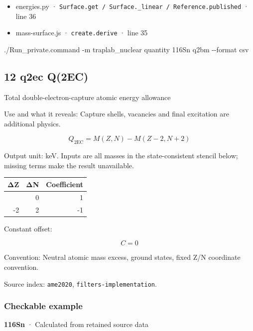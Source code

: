 \documentclass[
  11pt,
  letterpaper,
]{article}
\newenvironment{Shaded}{}{}
\newcommand{\AttributeTok}[1]{\textcolor[rgb]{0.49,0.56,0.16}{#1}}
\newcommand{\ExtensionTok}[1]{#1}
\newcommand{\NormalTok}[1]{#1}
\providecommand{\tightlist}{%
  \setlength{\itemsep}{0pt}\setlength{\parskip}{0pt}}
\begin{document}
\begin{itemize}
\tightlist
\item
  energies.py ·
  \texttt{Surface.get\ /\ Surface.\_linear\ /\ Reference.published} ·
  line 36
\item
  mass-surface.js · \texttt{create.derive} · line 35
\end{itemize}

\begin{Shaded}
\begin{Highlighting}[]
\ExtensionTok{./Run\_private.command} \AttributeTok{{-}m}\NormalTok{ traplab\_nuclear quantity 116Sn q2bm }\AttributeTok{{-}{-}format}\NormalTok{ csv}
\end{Highlighting}
\end{Shaded}

\subsection{12 q2ec Q(2EC)}\label{q2ec-q2ec}

Total double-electron-capture atomic energy allowance

Use and what it reveals: Capture shells, vacancies and final excitation
are additional physics.

\[
Q_{2{\mathrm{EC}}}=M(Z,N)-M(Z-2,N+2)
\]

Output unit: keV. Inputs are all masses in the state-consistent stencil
below; missing terms make the result unavailable.

\begin{longtable}[]{@{}rrr@{}}
\toprule\noalign{}
ΔZ & ΔN & Coefficient \\
\midrule\noalign{}
\endhead
\bottomrule\noalign{}
\endlastfoot
0 & 0 & 1 \\
-2 & 2 & -1 \\
\end{longtable}

Constant offset:

\[
C=0
\]

Convention: Neutral atomic mass excess, ground states, fixed Z/N
coordinate convention.

Source index: \texttt{ame2020}, \texttt{filters-implementation}.

\subsubsection{Checkable example}\label{checkable-example-11}

\textbf{116Sn} · Calculated from retained source data
\end{document}
